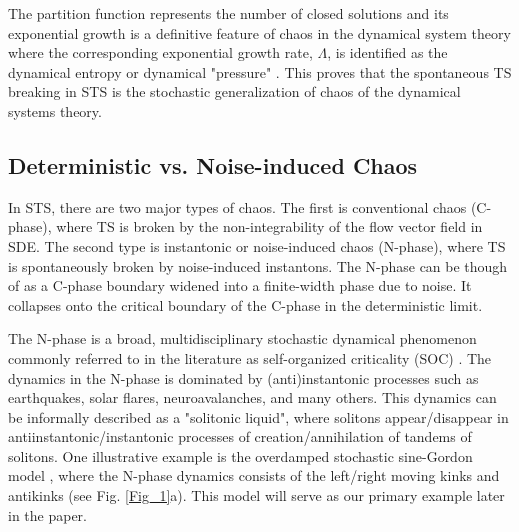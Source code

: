 \documentclass[final,5p,10pt,times,twocolumn,year]{elsarticle}
\begin{document}
The partition function represents the number of closed solutions and its exponential growth is a definitive feature of chaos in the dynamical system theory where the corresponding exponential growth rate, $\Lambda$, is identified as the dynamical entropy or dynamical "pressure" \cite{Rue02}. This proves that the spontaneous TS breaking in STS is the stochastic generalization of chaos of the dynamical systems theory.

\subsection{Deterministic vs. Noise-induced Chaos}
\label{Sec_SUSY_Breaking}

In STS, there are two major types of chaos. The first is conventional chaos (C-phase), where TS is broken by the non-integrability of the flow vector field in SDE. The second type is instantonic or noise-induced chaos (N-phase), where TS is spontaneously broken by noise-induced instantons. The N-phase can be though of as a C-phase boundary widened into a finite-width phase due to noise. It collapses onto the critical boundary of the C-phase in the deterministic limit.

The N-phase is a broad, multidisciplinary stochastic dynamical phenomenon commonly referred to in the literature as self-organized criticality (SOC) \cite{Bak87,A_recent_review_on_SOC,SOC_controvercy,Asc11,seizure}. The dynamics in the N-phase is dominated by (anti)instantonic processes such as earthquakes, solar flares, neuroavalanches, and many others. This dynamics can be informally described as a "solitonic liquid", where solitons appear/disappear in antiinstantonic/instantonic processes of creation/annihilation of tandems of solitons. One illustrative example is the overdamped stochastic sine-Gordon model \cite{OVCHINNIKOV2024114611}, where the N-phase dynamics consists of the left/right moving kinks and antikinks (see Fig. \ref{Fig_1}a). This model will serve as our primary example later in the paper.
\end{document}
